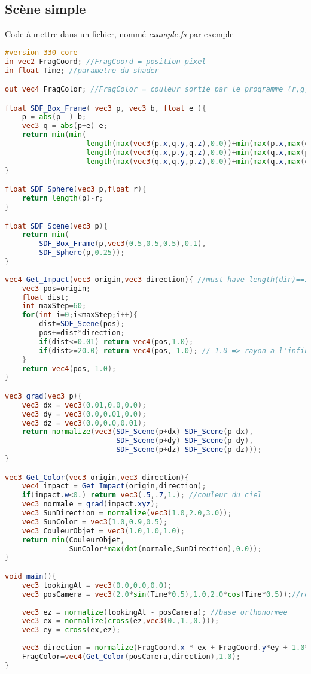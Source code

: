 \subsection{Scène simple}
Code à mettre dans un fichier, nommé \emph{example.fs} par exemple
\begin{lstlisting}[language=GLSL]
#version 330 core
in vec2 FragCoord; //FragCoord = position pixel
in float Time; //parametre du shader

out vec4 FragColor; //FragColor = couleur sortie par le programme (r,g,b,a)

float SDF_Box_Frame( vec3 p, vec3 b, float e ){
    p = abs(p  )-b;
    vec3 q = abs(p+e)-e;
    return min(min(
                   length(max(vec3(p.x,q.y,q.z),0.0))+min(max(p.x,max(q.y,q.z)),0.0),
                   length(max(vec3(q.x,p.y,q.z),0.0))+min(max(q.x,max(p.y,q.z)),0.0)),
                   length(max(vec3(q.x,q.y,p.z),0.0))+min(max(q.x,max(q.y,p.z)),0.0));
}

float SDF_Sphere(vec3 p,float r){
    return length(p)-r;
}

float SDF_Scene(vec3 p){
    return min(
        SDF_Box_Frame(p,vec3(0.5,0.5,0.5),0.1),
        SDF_Sphere(p,0.25));
}
    
vec4 Get_Impact(vec3 origin,vec3 direction){ //must have length(dir)==1 
    vec3 pos=origin;
    float dist;
    int maxStep=60;
    for(int i=0;i<maxStep;i++){
        dist=SDF_Scene(pos);
        pos+=dist*direction;
        if(dist<=0.01) return vec4(pos,1.0);
        if(dist>=20.0) return vec4(pos,-1.0); //-1.0 => rayon a l'infini
    }
    return vec4(pos,-1.0);
}

vec3 grad(vec3 p){
    vec3 dx = vec3(0.01,0.0,0.0);
    vec3 dy = vec3(0.0,0.01,0.0);
    vec3 dz = vec3(0.0,0.0,0.01);
    return normalize(vec3(SDF_Scene(p+dx)-SDF_Scene(p-dx),
                          SDF_Scene(p+dy)-SDF_Scene(p-dy),
                          SDF_Scene(p+dz)-SDF_Scene(p-dz)));
}

vec3 Get_Color(vec3 origin,vec3 direction){
    vec4 impact = Get_Impact(origin,direction);
    if(impact.w<0.) return vec3(.5,.7,1.); //couleur du ciel
    vec3 normale = grad(impact.xyz);
    vec3 SunDirection = normalize(vec3(1.0,2.0,3.0));
    vec3 SunColor = vec3(1.0,0.9,0.5);
    vec3 CouleurObjet = vec3(1.0,1.0,1.0);
    return min(CouleurObjet,
               SunColor*max(dot(normale,SunDirection),0.0));
}

void main(){
    vec3 lookingAt = vec3(0.0,0.0,0.0);
    vec3 posCamera = vec3(2.0*sin(Time*0.5),1.0,2.0*cos(Time*0.5));//rotating Camera
    
    vec3 ez = normalize(lookingAt - posCamera); //base orthonormee
    vec3 ex = normalize(cross(ez,vec3(0.,1.,0.)));
    vec3 ey = cross(ex,ez);
    
    vec3 direction = normalize(FragCoord.x * ex + FragCoord.y*ey + 1.0*ez);
    FragColor=vec4(Get_Color(posCamera,direction),1.0);
}

\end{lstlisting}